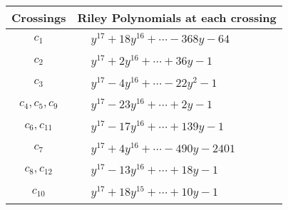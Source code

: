 \documentclass[1p]{elsarticle_modified}
\theoremstyle{definition}
\begin{document}
\begin{tabular}{m{50pt}|m{274pt}}
Crossings & \hspace{64pt}Riley Polynomials at each crossing \\
\hline $$\begin{aligned}c_{1}\end{aligned}$$&$\begin{aligned}
&y^{17}+18 y^{16}+\cdots-368 y-64
\end{aligned}$\\
\hline $$\begin{aligned}c_{2}\end{aligned}$$&$\begin{aligned}
&y^{17}+2 y^{16}+\cdots+36 y-1
\end{aligned}$\\
\hline $$\begin{aligned}c_{3}\end{aligned}$$&$\begin{aligned}
&y^{17}-4 y^{16}+\cdots-22 y^2-1
\end{aligned}$\\
\hline $$\begin{aligned}c_{4},c_{5},c_{9}\end{aligned}$$&$\begin{aligned}
&y^{17}-23 y^{16}+\cdots+2 y-1
\end{aligned}$\\
\hline $$\begin{aligned}c_{6},c_{11}\end{aligned}$$&$\begin{aligned}
&y^{17}-17 y^{16}+\cdots+139 y-1
\end{aligned}$\\
\hline $$\begin{aligned}c_{7}\end{aligned}$$&$\begin{aligned}
&y^{17}+4 y^{16}+\cdots-490 y-2401
\end{aligned}$\\
\hline $$\begin{aligned}c_{8},c_{12}\end{aligned}$$&$\begin{aligned}
&y^{17}-13 y^{16}+\cdots+18 y-1
\end{aligned}$\\
\hline $$\begin{aligned}c_{10}\end{aligned}$$&$\begin{aligned}
&y^{17}+18 y^{15}+\cdots+10 y-1
\end{aligned}$\\
\hline
\end{tabular}\\~\\
\end{document}

